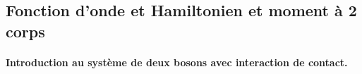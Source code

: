 %
%
%
%

\subsection{Fonction d’onde et Hamiltonien et moment à 2 corps}

\paragraph{Introduction au système de deux bosons avec interaction de contact.}


